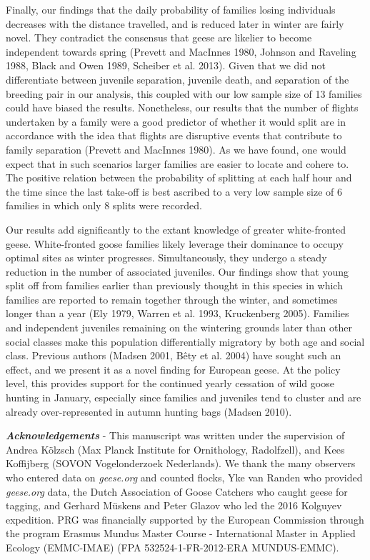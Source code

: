 \documentclass[10pt,twocolumn]{paper}
\begin{document}
Finally, our findings that the daily probability of families losing
individuals decreases with the distance travelled, and is reduced later
in winter are fairly novel. They contradict the consensus that geese are
likelier to become independent towards spring (Prevett and MacInnes
1980, Johnson and Raveling 1988, Black and Owen 1989, Scheiber et al.
2013). Given that we did not differentiate between juvenile separation,
juvenile death, and separation of the breeding pair in our analysis,
this coupled with our low sample size of 13 families could have biased
the results. Nonetheless, our results that the number of flights
undertaken by a family were a good predictor of whether it would split
are in accordance with the idea that flights are disruptive events that
contribute to family separation (Prevett and MacInnes 1980). As we have
found, one would expect that in such scenarios larger families are
easier to locate and cohere to. The positive relation between the
probability of splitting at each half hour and the time since the last
take-off is best ascribed to a very low sample size of 6 families in
which only 8 splits were recorded.

Our results add significantly to the extant knowledge of greater
white-fronted geese. White-fronted goose families likely leverage their
dominance to occupy optimal sites as winter progresses. Simultaneously,
they undergo a steady reduction in the number of associated juveniles.
Our findings show that young split off from families earlier than
previously thought in this species in which families are reported to
remain together through the winter, and sometimes longer than a year
(Ely 1979, Warren et al. 1993, Kruckenberg 2005). Families and
independent juveniles remaining on the wintering grounds later than
other social classes make this population differentially migratory by
both age and social class. Previous authors (Madsen 2001, Bêty et al.
2004) have sought such an effect, and we present it as a novel finding
for European geese. At the policy level, this provides support for the
continued yearly cessation of wild goose hunting in January, especially
since families and juveniles tend to cluster and are already
over-represented in autumn hunting bags (Madsen 2010).

\emph{\textbf{Acknowledgements}} - This manuscript was written under the
supervision of Andrea Kölzsch (Max Planck Institute for Ornithology,
Radolfzell), and Kees Koffijberg (SOVON Vogelonderzoek Nederlands). We
thank the many observers who entered data on \emph{geese.org} and
counted flocks, Yke van Randen who provided \emph{geese.org} data, the
Dutch Association of Goose Catchers who caught geese for tagging, and
Gerhard Müskens and Peter Glazov who led the 2016 Kolguyev expedition.
PRG was financially supported by the European Commission through the
program Erasmus Mundus Master Course - International Master in Applied
Ecology (EMMC-IMAE) (FPA 532524-1-FR-2012-ERA MUNDUS-EMMC).
\end{document}
